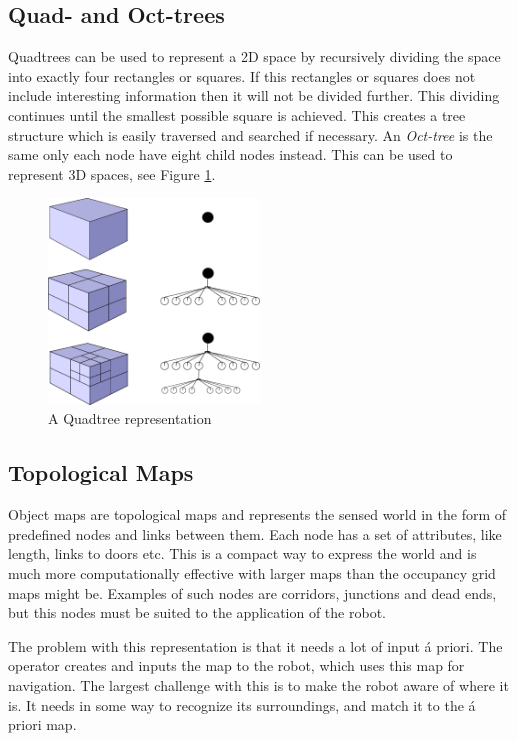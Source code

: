 \subsection{Quad- and Oct-trees}
Quadtrees can be used to represent a 2D space by recursively dividing the space into
exactly four rectangles or squares. If this rectangles or squares does not include
interesting information then it will not be divided further. This dividing continues until
the smallest possible square is achieved. This creates a tree structure which is easily
traversed and searched if necessary. An \emph{Oct-tree} is the same only each node have
eight child nodes instead. This can be used to represent 3D spaces, see Figure
\ref{chap2:fig-octtree}.
\begin{figure}[htbp]
    \centering
   \includegraphics[width=0.5\textwidth]{pics/octtree}
    \caption{A Quadtree representation}
    \label{chap2:fig-octtree}
\end{figure}


\subsection{Topological Maps}
Object maps are topological maps and represents the sensed world in the form of predefined nodes and links
between them. Each node has a set of attributes, like length, links to doors etc. This is
a compact way to express the world and is much more computationally effective with larger
maps than the occupancy grid maps might be. Examples of such nodes are corridors,
junctions and dead ends, but this nodes must be suited to the application of the robot. 

The problem with this representation is that it needs a lot of input \'a priori. The
operator creates and inputs the map to the robot, which uses this map for navigation. The
largest challenge with this is to make the robot aware of where it is. It needs in some
way to recognize its surroundings, and match it to the \'a priori map.

